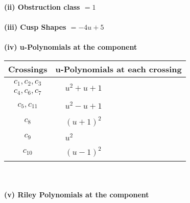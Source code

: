 \documentclass[1p]{elsarticle_modified}
\theoremstyle{definition}
\begin{document}
\flushleft \textbf{(ii) Obstruction class $= 1$}\\~\\
\flushleft \textbf{(iii) Cusp Shapes $= -4 u+5$}\\~\\
\newpage\renewcommand{\arraystretch}{1}
\flushleft \textbf{(iv) u-Polynomials at the component}\newline \\
\begin{tabular}{m{50pt}|m{274pt}}
Crossings & \hspace{64pt}u-Polynomials at each crossing \\
\hline $$\begin{aligned}c_{1},c_{2},c_{3}\\c_{4},c_{6},c_{7}\end{aligned}$$&$\begin{aligned}
&u^2+u+1
\end{aligned}$\\
\hline $$\begin{aligned}c_{5},c_{11}\end{aligned}$$&$\begin{aligned}
&u^2- u+1
\end{aligned}$\\
\hline $$\begin{aligned}c_{8}\end{aligned}$$&$\begin{aligned}
&(u+1)^2
\end{aligned}$\\
\hline $$\begin{aligned}c_{9}\end{aligned}$$&$\begin{aligned}
&u^2
\end{aligned}$\\
\hline $$\begin{aligned}c_{10}\end{aligned}$$&$\begin{aligned}
&(u-1)^2
\end{aligned}$\\
\hline
\end{tabular}\\~\\
\newpage\renewcommand{\arraystretch}{1}
\flushleft \textbf{(v) Riley Polynomials at the component}\newline \\
\end{document}
